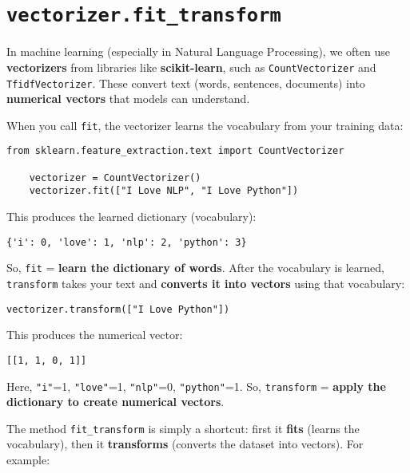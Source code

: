 \section{\texttt{vectorizer.fit\_transform}}

In machine learning (especially in Natural Language Processing), we often use 
\textbf{vectorizers} from libraries like \textbf{scikit-learn}, such as 
\texttt{CountVectorizer} and \texttt{TfidfVectorizer}. 
These convert text (words, sentences, documents) into \textbf{numerical vectors} 
that models can understand. 

When you call \texttt{fit}, the vectorizer learns the vocabulary from your training data:

\begin{lstlisting}[caption=Learning the vocabulary with \texttt{fit}]
	from sklearn.feature_extraction.text import CountVectorizer
	
	vectorizer = CountVectorizer()
	vectorizer.fit(["I Love NLP", "I Love Python"])
\end{lstlisting}

This produces the learned dictionary (vocabulary):

\begin{lstlisting}[caption=Vocabulary learned by \texttt{fit}]
	{'i': 0, 'love': 1, 'nlp': 2, 'python': 3}
\end{lstlisting}

So, \texttt{fit} = \textbf{learn the dictionary of words}.  
After the vocabulary is learned, \texttt{transform} takes your text and 
\textbf{converts it into vectors} using that vocabulary:

\begin{lstlisting}[caption=Transforming a new document]
	vectorizer.transform(["I Love Python"])
\end{lstlisting}

This produces the numerical vector:

\begin{lstlisting}[caption=Vector representation]
	[[1, 1, 0, 1]]
\end{lstlisting}

Here, \texttt{"i"}=1, \texttt{"love"}=1, \texttt{"nlp"}=0, \texttt{"python"}=1.  
So, \texttt{transform} = \textbf{apply the dictionary to create numerical vectors}.  

The method \texttt{fit\_transform} is simply a shortcut: first it 
\textbf{fits} (learns the vocabulary), then it \textbf{transforms} (converts the dataset 
into vectors). For example:

